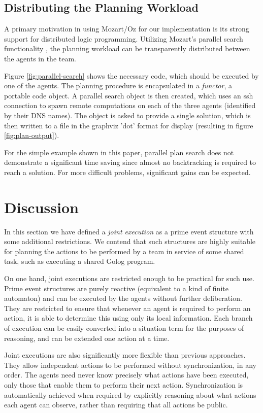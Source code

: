 \subsection{Distributing the Planning Workload}

A primary motivation in using Mozart/Oz for our implementation is
its strong support for distributed logic programming. Utilizing Mozart's
parallel search functionality \citep{Schulte00constraint_services},
the planning workload can be transparently distributed between the
agents in the team.

Figure \ref{fig:parallel-search} shows the necessary code, which
should be executed by one of the agents. The planning procedure is
encapsulated in a \emph{functor}, a portable code object. A parallel
search object is then created, which uses an ssh connection to spawn
remote computations on each of the three agents (identified by their
DNS names). The object is asked to provide a single solution, which
is then written to a file in the graphviz 'dot' format for display
(resulting in figure \ref{fig:plan-output}).

For the simple example shown in this paper, parallel plan search does
not demonstrate a significant time saving since almost no backtracking
is required to reach a solution. For more difficult problems, significant
gains can be expected.


\section{Discussion\label{sec:JointExec:Discussion}}

In this section we have defined a \emph{joint execution} as a prime
event structure with some additional restrictions. We contend that
such structures are highly suitable for planning the actions to be
performed by a team in service of some shared task, such as executing
a shared Golog program.

On one hand, joint executions are restricted enough to be practical
for such use. Prime event structures are purely reactive (equivalent
to a kind of finite automaton) and can be executed by the agents without
further deliberation. They are restricted to ensure that whenever
an agent is required to perform an action, it is able to determine
this using only its local information. Each branch of execution can
be easily converted into a situation term for the purposes of reasoning,
and can be extended one action at a time.

Joint executions are also significantly more flexible than previous
approaches. They allow independent actions to be performed without
synchronization, in any order. The agents need never know precisely
what actions have been executed, only those that enable them to perform
their next action. Synchronization is automatically achieved when
required by explicitly reasoning about what actions each agent can
observe, rather than requiring that all actions be public.

